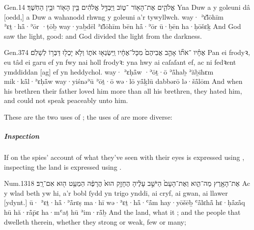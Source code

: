 \begin{example}{Gen.}{1}{4}{}{}
	\quoling
	{ אֱלֹהִ֛ים אֶת־הָא֖וֹר ־ט֑וֹב וַיַּבְדֵּ֣ל אֱלֹהִ֔ים בֵּ֥ין הָא֖וֹר וּבֵ֥ין הַחֹֽשֶׁךְ׃}
	{Yna Duw a  y goleuni  dâ [oedd,] a Duw a wahanodd rhwng y goleuni a’r tywyllwch.}
	{way· ʾɛ̆lōhīm ʾɛṯ·hå̄·ʾōr ·ṭōḇ way·yaḇdēl ʾɛ̆lōhīm bēn hå̄·ʾōr ū·ḇēn ha·ḥōšɛḵ}
	{And God saw the light,   good: and God divided the light from the darkness.}
\end{example}

\begin{example}{Gen.}{37}{4}{}{}
	\quoling
	{ אֶחָ֗יו ־אֹת֞וֹ אָהַ֤ב אֲבִיהֶם֙ מִכָּל־אֶחָ֔יו וַֽיִּשְׂנְא֖וּ אֹת֑וֹ וְלֹ֥א יָכְל֖וּ דַּבְּר֥וֹ לְשָׁלֹֽם׃}
	{Pan  ei frodyꝛ,  eu tâd  ei garu ef yn fwy nai holl frodyꝛ: yna hwy ai caſaſant ef, ac ni fedꝛent ymddiddan [ag] ef yn heddychol.}
	{way· ʾɛḥå̄w ·ʾōṯ·ō ʾå̄haḇ ʾăḇīhɛm mik·kå̄l·ʾɛḥå̄w way·yiśnəʾū ʾōṯ·ō wə·lō yå̄ḵlū dabbərō lə·šå̄lōm}
	{And when his brethren   their father loved him more than all his brethren, they hated him, and could not speak peaceably unto him.}
\end{example}

\begin{paper}
	{\click}{\click} These are the two uses of ; the uses of  are more diverse:
\end{paper}



\paragraph{}

\subparagraph{Inspection}

\begin{paper}
	If on  the spies’ account of what they’ve seen with their eyes is expressed using , inspecting the land is expressed using .
\end{paper}

\begin{example}{Num.}{13}{18}{}{}
	\quoling
	{ אֶת־הָאָ֖רֶץ מַה־הִ֑וא וְאֶת־הָעָם֙ הַיֹּשֵׁ֣ב עָלֶ֔יהָ הֶחָזָ֥ק הוּא֙ הֲרָפֶ֔ה הַמְעַ֥ט ה֖וּא אִם־רָֽב׃}
	{Ac  y wlad beth yw hi, a’r bobl ſydd yn trigo ynddi, ai cryf, ai gwan, ai llawer [ydynt.]}
	{ū· ʾɛṯ·hå̄·ʾå̄rɛṣ ma·hī wə·ʾɛṯ·hå̄·ʿå̄m hay·yōšēḇ ʿå̄lɛhå̄ hɛ·ḥå̄zå̄q hū hă·rå̄p̄ɛ ha·mʿaṭ hū ʾim·rå̄ḇ}
	{And  the land, what it ; and the people that dwelleth therein, whether they  strong or weak, few or many;}
\end{example}


